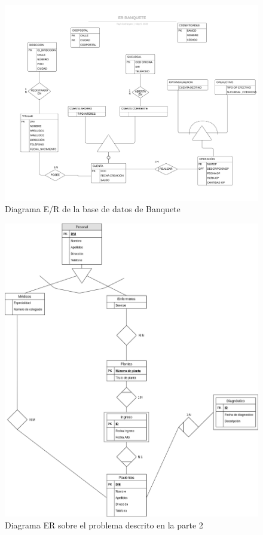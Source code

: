 \documentclass{article}
\begin{document}
\newpage
\begin{landscape}
\begin{figure}
\centering
\includegraphics[scale=0.75]{images/ER_BANQUETE.jpeg}
\caption{Diagrama E/R de la base de datos de Banquete}
\label{fig:er_banquete}
\end{figure}
\end{landscape}
\pagebreak





\begin{figure}
\centering
\includegraphics[scale=0.5]{images/er_parte2_2.png}
\caption{Diagrama ER sobre el problema descrito en la parte 2}
\label{fig:er_parte2_2}
\end{figure}
\end{document}
